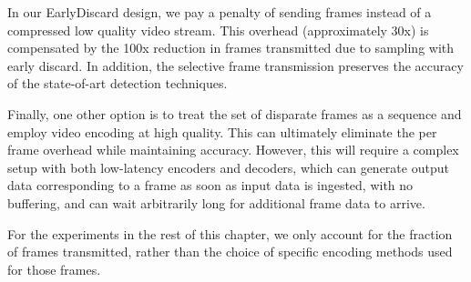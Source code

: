 In our EarlyDiscard design, we pay a penalty of sending frames instead of a
compressed low quality video stream. This overhead (approximately 30x) is
compensated by the 100x reduction in frames transmitted due to sampling with
early discard. In addition, the selective frame transmission preserves the
accuracy of the state-of-art detection techniques.

Finally, one other option is to treat the set of disparate frames as a sequence
and employ video encoding at high quality. This can ultimately eliminate the per
frame overhead while maintaining accuracy. However, this will require a complex setup with
both low-latency encoders and decoders, which can generate output data
corresponding to a frame as soon as input data is ingested, with no buffering,
and can wait arbitrarily long for additional frame data to arrive. 

For the experiments in the rest of this chapter, we only account for the
fraction of frames transmitted, rather than the choice of specific encoding
methods used for those frames.



